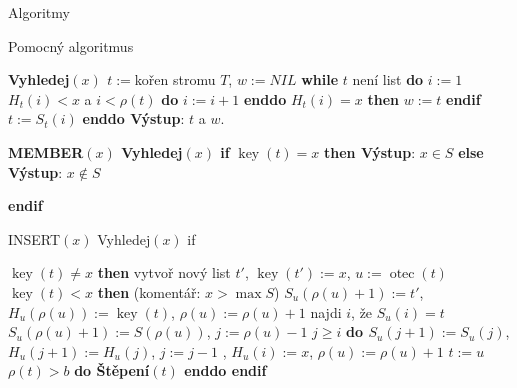 \documentclass[a4paper,12pt]{article}
\DeclareMathOperator*{\otec}{otec}
\DeclareMathOperator*{\key}{key}
\begin{document}
\subhead 
Algoritmy
\endsubhead

Pomocný algoritmus

{\bf Vyhledej$(x)$\newline 
$t:=$}kořen stromu $T$, $w:=NIL$\newline 
{\bf while} $t$ není list {\bf do}\newline 
\phantom{---}$i:=1$\newline 
\phantom{---}{\bf while} $H_t(i)<x$ a $i<\rho (t)$ {\bf do} $i:=i+1$ {\bf enddo}\newline 
\phantom{---}{\bf if} $H_t(i)=x$ {\bf then} $w:=t$ {\bf endif}\newline 
$t:=S_t(i)$ {\bf enddo Výstup}: $t$ a $w$.

{\bf MEMBER$(x)$\newline 
Vyhledej$(x)$\newline 
if} $\key(t)=x$ {\bf then Výstup}: $x\in S$ {\bf else Výstup}: $x\notin S$ {\bf endif

INSERT$(x)$\newline
Vyhledej$(x)$\newline 
if} $\key(t)\ne x$ {\bf then}\newline 
\phantom{---}vytvoř nový list $t'$, $\key(t'):=x$, $u:=\otec(t)$\newline 
\phantom{---}{\bf if} $\key(t)<x$ {\bf then}\newline 
(komentář: $x>\max S$)\newline 
\phantom{------}$S_u(\rho (u)+1):=t'$, $H_u(\rho (u)):=\key(t)$, $\rho (u):=\rho 
(u)+1$\newline 
\phantom{---}{\bf else}\newline 
\phantom{------}najdi $i$, že $S_u(i)=t$\newline 
\phantom{------}$S_u(\rho (u)+1):=S(\rho (u))$, $j:=\rho (u)-1$\newline 
\phantom{------}{\bf while} $j\ge i$ {\bf do\newline 
\phantom{---------}$S_u(j+1):=S_u(j)$}, $H_u(j+1):=H_u(j)$, $j:=j-1$\newline 
{}, $H_u(i):=x$, $\rho (u):=\rho (u)+1$\newline 
\phantom{---}{\bf endif}\newline 
\phantom{---}$t:=u$\newline 
\phantom{---}{\bf while} $\rho (t)>b$ {\bf do Štěpení$(t)$ enddo\newline 
endif}
\end{document}
